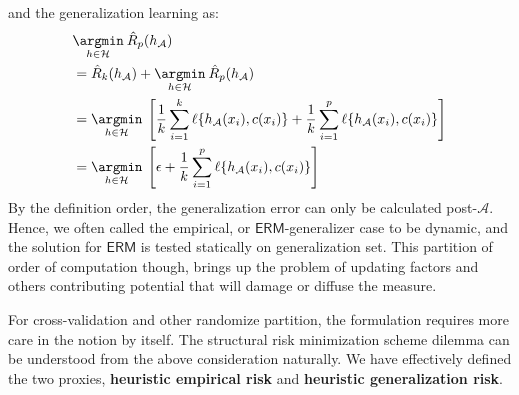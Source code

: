 \documentclass[
  journal=largetwo,
  year=2025,
  volume=37,
]{cup-journal}
\begin{document}
and the generalization learning as: 
\begin{equation}
    \begin{split}
        &\underset{h\in \mathcal{H}}{\argmin}\: \hat{R}_{p}(h_{\mathcal{A}}) \\
        & = \hat{R}_{k}(h_{\mathcal{A}}) + \underset{h\in \mathcal{H}}{\argmin}\:\hat{R}_{p}(h_{\mathcal{A}})\\
        & =  \underset{h\in \mathcal{H}}{\argmin}\: \left[\frac{1}{k} \sum^{k}_{i=1} \ell\{h_{\mathcal{A}}(x_{i}),c(x_{i})\} + \frac{1}{k} \sum^{p}_{i=1} \ell\{h_{\mathcal{A}}(x_{i}),c(x_{i})\}\right]\\
        & = \underset{h\in \mathcal{H}}{\argmin}\: \left[\epsilon + \frac{1}{k} \sum^{p}_{i=1} \ell\{h_{\mathcal{A}}(x_{i}),c(x_{i})\}\right]
    \end{split}
\end{equation}
By the definition order, the generalization error can only be calculated post-$\mathcal{A}$. Hence, we often called the empirical, or $\mathsf{ERM}$-generalizer case to be dynamic, and the solution for $\mathsf{ERM}$ is tested statically on generalization set. This partition of order of computation though, brings up the problem of updating factors and others contributing potential that will damage or diffuse the measure. 

For cross-validation and other randomize partition, the formulation requires more care in the notion by itself. The structural risk minimization scheme dilemma can be understood from the above consideration naturally. We have effectively defined the two proxies, \textbf{heuristic empirical risk} and \textbf{heuristic generalization risk}. 
\end{document}
